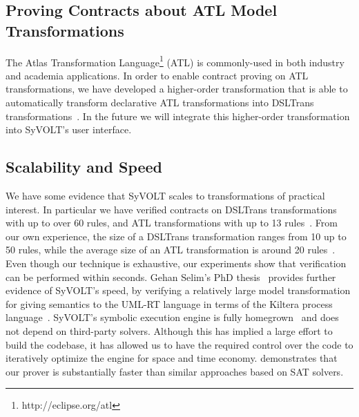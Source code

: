 \subsection{Proving Contracts about ATL Model Transformations}
The Atlas Transformation Language\footnote{http://eclipse.org/atl} (ATL) is
commonly-used in both industry and academia applications. In order to enable contract proving on ATL transformations, we
have developed a higher-order transformation that is able to automatically
transform declarative ATL transformations into DSLTrans transformations~\cite{Oakes}. 
In the future we will integrate this higher-order transformation into SyVOLT's
user interface.

\subsection{Scalability and Speed}

We have some evidence that SyVOLT scales to transformations of practical
interest. In particular we have verified contracts on DSLTrans transformations with up to
over 60 rules, and ATL transformations with up to 13 rules~\cite{Oakes}. From our own
experience, the size of a DSLTrans transformation ranges from 10 up to 50 rules, while the average size of an ATL
transformation is around 20 rules~\cite{KuselSWRSK13}.
Even though our technique is exhaustive, our experiments show that verification can be performed within seconds.
Gehan Selim's PhD thesis~\cite{Selim2015} provides further evidence of SyVOLT's speed, by verifying a relatively large model transformation
for giving semantics to the UML-RT language in terms of the Kiltera process
language~\cite{PosseDingel2014}. SyVOLT's symbolic execution engine is fully
homegrown~\cite{LucioVang} and does not depend on third-party solvers. Although
this has implied a large effort to build the codebase, it has allowed us to
have the required control over the code to iteratively optimize the engine for
space and time economy.
\cite{Selim2014} demonstrates that our prover is substantially faster than
similar approaches based on SAT solvers.








